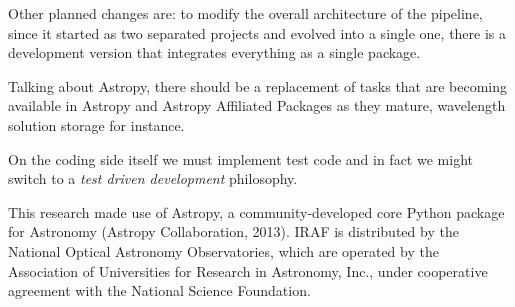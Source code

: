 \documentclass[11pt,twoside]{article}
\begin{document}
Other planned changes are: to modify the overall architecture of the pipeline,
since it started as two separated projects and evolved into a single one, there
is a development version that integrates everything as a single package.

Talking about Astropy, there should be a replacement of tasks that are becoming
available in Astropy and Astropy Affiliated Packages as they mature, wavelength
solution storage for instance.

On the coding side itself we must implement test code and in fact we might switch
to a \emph{test driven development} philosophy.

\acknowledgements  This research made use of Astropy, a community-developed core Python package for Astronomy (Astropy Collaboration, 2013). IRAF is distributed by the National Optical Astronomy Observatories, which are operated by the Association of Universities for Research in Astronomy, Inc., under cooperative agreement with the National Science Foundation.


\end{document}
